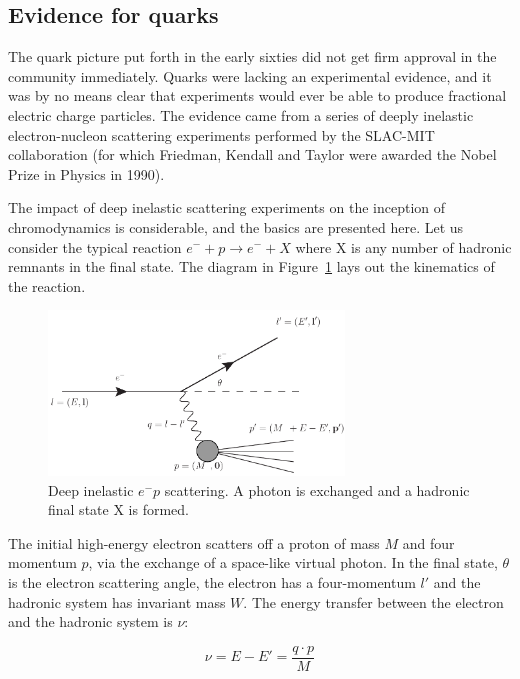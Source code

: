\subsection{Evidence for quarks}
\label{sec:quarks}
The quark picture put forth in the early sixties did not get
firm approval in the community immediately. Quarks were lacking an
experimental evidence, and it was by no means clear that experiments
would ever be able to produce fractional electric charge particles. The
evidence came from a series of deeply inelastic electron-nucleon
scattering experiments performed
by the SLAC-MIT collaboration (for which Friedman, Kendall and Taylor were awarded the Nobel Prize in Physics in 1990).


The impact of deep inelastic scattering experiments on the inception
of chromodynamics is considerable, and the basics are
presented here. Let us consider the typical reaction $e^{-}+p \to e^{-}+X$ where X is
any number of hadronic remnants in the final state. The diagram in Figure~\ref{fig:dis_test} lays out the kinematics
of the reaction.
\begin{figure}[h]
\begin{center}
  \includegraphics[width=0.7\textwidth]{Chapters/pQCD/DIS_test.pdf}
 \caption{Deep inelastic $e^{-}p$ scattering. A photon is exchanged
   and a hadronic final state X is formed.}
 \label{fig:dis_test}
\end{center}
\end{figure}

The initial high-energy electron scatters off a proton of mass $M$
and four momentum $p$, via the exchange of a space-like virtual
photon. In the final state, $\theta$ is the electron scattering angle, the electron has a
four-momentum $l'$ and the hadronic system has invariant mass $W$. The
energy transfer between the electron and the hadronic system is $\nu$:

\begin{equation}
\nu = E - E' = \frac{q\cdot p}{M}
\end{equation}


